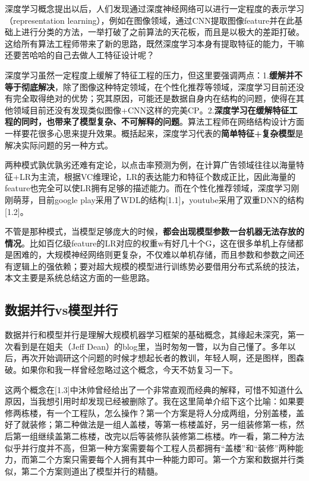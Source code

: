 \documentclass[12pt]{article}
\begin{document}
深度学习概念提出以后，人们发现通过深度神经网络可以进行一定程度的表示学习（representation learning），例如在图像领域，通过CNN提取图像feature并在此基础上进行分类的方法，一举打破了之前算法的天花板，而且是以极大的差距打破。这给所有算法工程师带来了新的思路，既然深度学习本身有提取特征的能力，干嘛还要苦哈哈的自己去做人工特征设计呢？

深度学习虽然一定程度上缓解了特征工程的压力，但这里要强调两点：1.\textbf{缓解并不等于彻底解决}，除了图像这种特定领域，在个性化推荐等领域，深度学习目前还没有完全取得绝对的优势；究其原因，可能还是数据自身内在结构的问题，使得在其他领域目前还没有发现类似图像+CNN这样的完美CP。2.\textbf{深度学习在缓解特征工程的同时，也带来了模型复杂、不可解释的问题}。算法工程师在网络结构设计方面一样要花很多心思来提升效果。概括起来，深度学习代表的\textbf{简单特征+复杂模型}是解决实际问题的另一种方式。

两种模式孰优孰劣还难有定论，以点击率预测为例，在计算广告领域往往以海量特征+LR为主流，根据VC维理论，LR的表达能力和特征个数成正比，因此海量的feature也完全可以使LR拥有足够的描述能力。而在个性化推荐领域，深度学习刚刚萌芽，目前google play采用了WDL的结构[1.1]，youtube采用了双重DNN的结构[1.2]。

不管是那种模式，当模型足够庞大的时候，\textbf{都会出现模型参数一台机器无法存放的情况}。比如百亿级feature的LR对应的权重w有好几十个G，这在很多单机上存储都是困难的，大规模神经网络则更复杂，不仅难以单机存储，而且参数和参数之间还有逻辑上的强依赖；要对超大规模的模型进行训练势必要借用分布式系统的技法，本文主要是系统总结这方面的一些思路。

\subsection{数据并行vs模型并行}
数据并行和模型并行是理解大规模机器学习框架的基础概念，其缘起未深究，第一次看到是在姐夫（Jeff Dean）的blog里，当时匆匆一瞥，以为自己懂了。多年以后，再次开始调研这个问题的时候才想起长者的教训，年轻人啊，还是图样，图森破。如果你和我一样曾经忽略过这个概念，今天不妨复习一下。

这两个概念在[1.3]中沐帅曾经给出了一个非常直观而经典的解释，可惜不知道什么原因，当我想引用时却发现已经被删除了。我在这里简单介绍下这个比喻：如果要修两栋楼，有一个工程队，怎么操作？第一个方案是将人分成两组，分别盖楼，盖好了就装修；第二种做法是一组人盖楼，等第一栋楼盖好，另一组装修第一栋，然后第一组继续盖第二栋楼，改完以后等装修队装修第二栋楼。咋一看，第二种方法似乎并行度并不高，但第一种方案需要每个工程人员都拥有“盖楼”和“装修”两种能力，而第二个方案只需要每个人拥有其中一种能力即可。第一个方案和数据并行类似，第二个方案则道出了模型并行的精髓。
\end{document}
